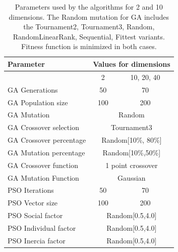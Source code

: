 \documentclass[runningheads]{llncs}
\begin{document}
   \begin{table}[h!tp]
    \caption{Parameters used by the algorithms for 2 and 10 dimensions. The Random mutation for GA includes the Tournament2, Tournament3, Random, RandomLinearRank, Sequential, Fittest variants. Fitness function is minimized in both cases.}
    \label{table:ga-pso-parameters}
    \centering
    \begin{tabular}{|l|c|c|}
    \hline
    Parameter & \multicolumn{2}{c|}{Values for dimensions} \\
      \hline
      & 2 & 10, 20, 40 \\
    \hline
    GA Generations & 50 &  70\\
    \hline
     GA Population size & 100 & 200\\
    \hline
    GA Mutation &  \multicolumn{2}{c|}{Random}\\
    \hline
    GA Crossover selection & \multicolumn{2}{c|}{Tournament3} \\
    \hline
    GA Crossover percentage & \multicolumn{2}{c|}{Random[10\%, 80\%]} \\
    \hline
    GA Mutation percentage & \multicolumn{2}{c|}{Random[10\%,50\%]} \\
    \hline
    GA Crossover function & \multicolumn{2}{c|}{1 point crossover} \\
    \hline
    GA Mutation Function & \multicolumn{2}{c|}{Gaussian} \\
      \hline 
      \hline
    PSO Iterations & 50 & 70\\
    \hline
    PSO Vector size & 100 & 200\\
    \hline
    PSO Social factor & \multicolumn{2}{c|}{Random[0.5,4.0]} \\
    \hline
    PSO Individual factor & \multicolumn{2}{c|}{Random[0.5,4.0]} \\
    \hline
    PSO Inercia factor & \multicolumn{2}{c|}{Random[0.5,4.0]} \\
    \hline
    \end{tabular}
    \end{table}


  
\end{document}
